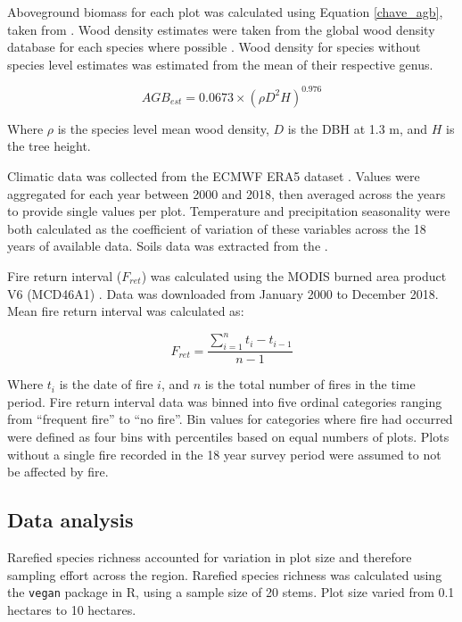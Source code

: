 \documentclass[11pt,a4paper]{article}
\begin{document}
Aboveground biomass for each plot was calculated using Equation \ref{chave_agb}, taken from \citet{Chave2014}. Wood density estimates were taken from the global wood density database for each species where possible \citep{Chave2009, Zanne2009}. Wood density for species without species level estimates was estimated from the mean of their respective genus. 

\begin{equation}
	AGB_{est} = 0.0673 \times (\rho D^{2} H)^{0.976}
	\label{chave_agb}
\end{equation}

Where $\rho$ is the species level mean wood density, $D$ is the DBH at 1.3 m, and $H$ is the tree height.

Climatic data was collected from the ECMWF ERA5 dataset \citep{}. Values were aggregated for each year between 2000 and 2018, then averaged across the years to provide single values per plot. Temperature and precipitation seasonality were both calculated as the coefficient of variation of these variables across the 18 years of available data. Soils data was extracted from the . 

Fire return interval ($F_{ret}$) was calculated using the MODIS burned area product V6 (MCD46A1) \citep{}. Data was downloaded from January 2000 to December 2018. Mean fire return interval was calculated as:

\begin{equation}
	F_{ret} = \frac{\sum_{i = 1}^{n} t_{i} - t_{i-1}}{n-1}
\end{equation}

Where $t_{i}$ is the date of fire $i$, and $n$ is the total number of fires in the time period. Fire return interval data was binned into five ordinal categories ranging from ``frequent fire'' to ``no fire''. Bin values for categories where fire had occurred were defined as four bins with percentiles based on equal numbers of plots. Plots without a single fire recorded in the 18 year survey period were assumed to not be affected by fire. 

\subsection{Data analysis}
Rarefied species richness accounted for variation in plot size and therefore sampling effort across the region. Rarefied species richness was calculated using the \verb|vegan| package in R, using a sample size of 20 stems. Plot size varied from 0.1 hectares to 10 hectares.
\end{document}
